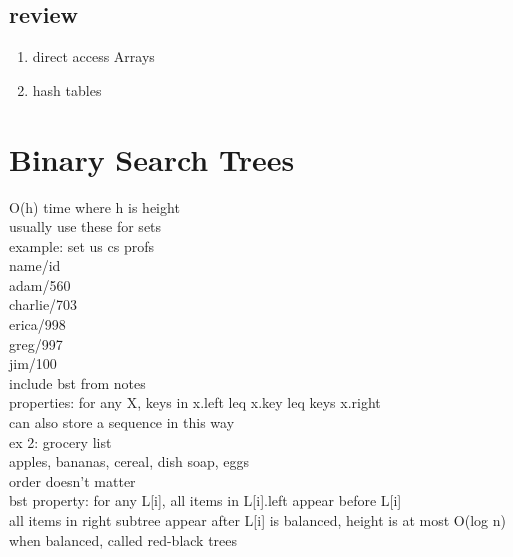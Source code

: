 \documentclass{article}
\begin{document}
\subsection{review}
\begin{enumerate}
    \item direct access Arrays
    \item hash tables
\end{enumerate}

\section{Binary Search Trees}
O(h) time where h is height\\
usually use these for sets\\
example: set us cs profs\\
name/id\\
adam/560\\
charlie/703\\
erica/998\\
greg/997\\
jim/100\\
include bst from notes\\
properties: for any X, keys in x.left leq x.key leq keys x.right\\
can also store a sequence in this way\\
ex 2: grocery list\\
apples, bananas, cereal, dish soap, eggs\\
order doesn't matter\\
bst property: for any L[i], all items in L[i].left appear before L[i]\\
all items in right subtree appear after L[i]
is balanced, height is at most O(log n)\\
when balanced, called red-black trees\\
\\
\\
\end{document}

